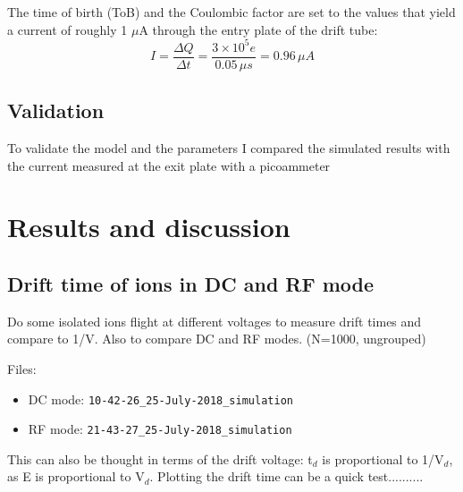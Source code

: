 The time of birth (ToB) and the Coulombic factor are set to the values that yield a current of roughly 1 $\mu$A through the entry plate of the drift tube:
\begin{equation}
I = \frac{\Delta Q}{\Delta t} = \frac{3\times10^5 e}{0.05\, \mu s} = 0.96\, \mu A
\end{equation}



\subsection{Validation}
To validate the model and the parameters I compared the simulated results with the current measured at the exit plate with a picoammeter 








\section{Results and discussion}


\subsection{Drift time of ions in DC and RF mode}
Do some isolated ions flight at different voltages to measure drift times and compare to 1\slash V. Also to compare DC and RF modes. (N=1000, ungrouped)




 Files:
 \begin{itemize}
 \item DC mode: \verb|10-42-26_25-July-2018_simulation|
 \item RF mode: \verb|21-43-27_25-July-2018_simulation|
 \end{itemize}

 This can also be thought in terms of the drift voltage: t$_d$ is  proportional to 1\slash V$_d$, as E is proportional to V$_d$. Plotting the drift time can be a quick test..........

